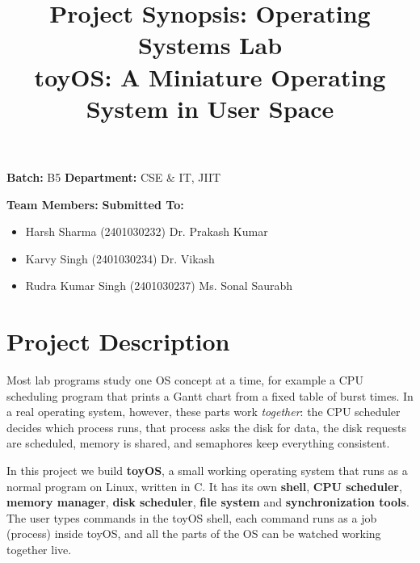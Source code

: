 \documentclass[11pt,a4paper]{article}
\title{\textbf{Project Synopsis: Operating Systems Lab}\\[0.3em]\large toyOS: A Miniature Operating System in User Space}
\author{}
\date{}
\begin{document}
\maketitle
\vspace{-3.5em}
\noindent\textbf{Batch:} B5 \hfill \textbf{Department:} CSE \& IT, JIIT
\vspace{0.5em}

\noindent\textbf{Team Members:} \hfill \textbf{Submitted To:}
\begin{itemize}[leftmargin=*, itemsep=0pt, parsep=0pt, topsep=0pt]
    \item Harsh Sharma (2401030232) \hfill Dr. Prakash Kumar
    \item Karvy Singh (2401030234) \hfill Dr. Vikash
    \item Rudra Kumar Singh (2401030237) \hfill Ms. Sonal Saurabh
\end{itemize}

\section*{Project Description}
Most lab programs study one OS concept at a time, for example a CPU scheduling program that prints a Gantt chart from a fixed table of burst times. In a real operating system, however, these parts work \emph{together}: the CPU scheduler decides which process runs, that process asks the disk for data, the disk requests are scheduled, memory is shared, and semaphores keep everything consistent.

In this project we build \textbf{toyOS}, a small working operating system that runs as a normal program on Linux, written in C. It has its own \textbf{shell}, \textbf{CPU scheduler}, \textbf{memory manager}, \textbf{disk scheduler}, \textbf{file system} and \textbf{synchronization tools}. The user types commands in the toyOS shell, each command runs as a job (process) inside toyOS, and all the parts of the OS can be watched working together live.
\end{document}
